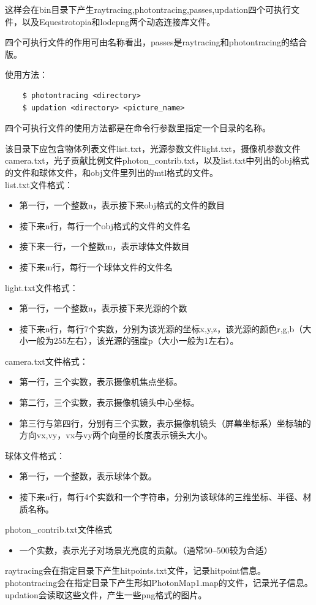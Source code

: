 \documentclass[a4paper,12pt]{article}
\theoremstyle{plain}
\numberwithin{thmdef}{section}
\begin{document}
这样会在bin目录下产生raytracing,photontracing,passes,updation四个可执行文件，以及Equestrotopia和lodepng两个动态连接库文件。\par
四个可执行文件的作用可由名称看出，passes是raytracing和photontracing的结合版。\par
使用方法：
\begin{verbatim}
    $ photontracing <directory>
    $ updation <directory> <picture_name>
\end{verbatim}
四个可执行文件的使用方法都是在命令行参数里指定一个目录的名称。\par
该目录下应包含物体列表文件list.txt，光源参数文件light.txt，摄像机参数文件camera.txt，光子贡献比例文件photon\_contrib.txt，以及list.txt中列出的obj格式的文件和球体文件，和obj文件里列出的mtl格式的文件。\\
list.txt文件格式：
\begin{itemize}
    \small \setlength{\itemsep}{.1em}
    \item 第一行，一个整数n，表示接下来obj格式的文件的数目
    \item 接下来n行，每行一个obj格式的文件的文件名
    \item 接下来一行，一个整数m，表示球体文件数目
    \item 接下来m行，每行一个球体文件的文件名
\end{itemize}
light.txt文件格式：
\begin{itemize}
    \small \setlength{\itemsep}{.1em}
    \item 第一行，一个整数n，表示接下来光源的个数
    \item 接下来n行，每行7个实数，分别为该光源的坐标x,y,z，该光源的颜色r,g,b（大小一般为255左右），该光源的强度p（大小一般为1左右）。
\end{itemize}
camera.txt文件格式：
\begin{itemize}
    \small \setlength{\itemsep}{.1em}
    \item 第一行，三个实数，表示摄像机焦点坐标。
    \item 第二行，三个实数，表示摄像机镜头中心坐标。
    \item 第三行与第四行，分别有三个实数，表示摄像机镜头（屏幕坐标系）坐标轴的方向vx,vy，vx与vy两个向量的长度表示镜头大小。
\end{itemize}
球体文件格式：
\begin{itemize}
    \small \setlength{\itemsep}{.1em}
    \item 第一行，一个整数，表示球体个数。
    \item 接下来n行，每行4个实数和一个字符串，分别为该球体的三维坐标、半径、材质名称。
\end{itemize}
photon\_contrib.txt文件格式
\begin{itemize}
    \small \setlength{\itemsep}{.1em}
    \item 一个实数，表示光子对场景光亮度的贡献。（通常50--500较为合适）
\end{itemize}
raytracing会在指定目录下产生hitpoints.txt文件，记录hitpoint信息。\\
photontracing会在指定目录下产生形如PhotonMap1.map的文件，记录光子信息。\\
updation会读取这些文件，产生一些png格式的图片。
\end{document}
